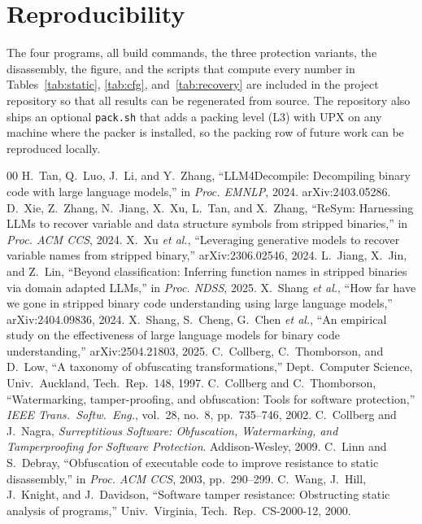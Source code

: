 \documentclass[conference]{IEEEtran}
\begin{document}
\section*{Reproducibility}
The four programs, all build commands, the three protection variants, the
disassembly, the figure, and the scripts that compute every number in
Tables~\ref{tab:static}, \ref{tab:cfg}, and~\ref{tab:recovery} are included in the
project repository so that all results can be regenerated from source. The
repository also ships an optional \texttt{pack.sh} that adds a packing level
(L3) with UPX on any machine where the packer is installed, so the packing row
of future work can be reproduced locally.

\begin{thebibliography}{00}
 H.~Tan, Q.~Luo, J.~Li, and Y.~Zhang, ``LLM4Decompile: Decompiling binary code with large language models,'' in \emph{Proc. EMNLP}, 2024. arXiv:2403.05286.
 D.~Xie, Z.~Zhang, N.~Jiang, X.~Xu, L.~Tan, and X.~Zhang, ``ReSym: Harnessing LLMs to recover variable and data structure symbols from stripped binaries,'' in \emph{Proc. ACM CCS}, 2024.
 X.~Xu \emph{et al.}, ``Leveraging generative models to recover variable names from stripped binary,'' arXiv:2306.02546, 2024.
 L.~Jiang, X.~Jin, and Z.~Lin, ``Beyond classification: Inferring function names in stripped binaries via domain adapted LLMs,'' in \emph{Proc. NDSS}, 2025.
 X.~Shang \emph{et al.}, ``How far have we gone in stripped binary code understanding using large language models,'' arXiv:2404.09836, 2024.
 X.~Shang, S.~Cheng, G.~Chen \emph{et al.}, ``An empirical study on the effectiveness of large language models for binary code understanding,'' arXiv:2504.21803, 2025.
 C.~Collberg, C.~Thomborson, and D.~Low, ``A taxonomy of obfuscating transformations,'' Dept.\ Computer Science, Univ.\ Auckland, Tech.\ Rep.\ 148, 1997.
 C.~Collberg and C.~Thomborson, ``Watermarking, tamper-proofing, and obfuscation: Tools for software protection,'' \emph{IEEE Trans.\ Softw.\ Eng.}, vol.~28, no.~8, pp.~735--746, 2002.
 C.~Collberg and J.~Nagra, \emph{Surreptitious Software: Obfuscation, Watermarking, and Tamperproofing for Software Protection}. Addison-Wesley, 2009.
 C.~Linn and S.~Debray, ``Obfuscation of executable code to improve resistance to static disassembly,'' in \emph{Proc. ACM CCS}, 2003, pp.~290--299.
 C.~Wang, J.~Hill, J.~Knight, and J.~Davidson, ``Software tamper resistance: Obstructing static analysis of programs,'' Univ.\ Virginia, Tech.\ Rep.\ CS-2000-12, 2000.

\end{thebibliography}
\end{document}
